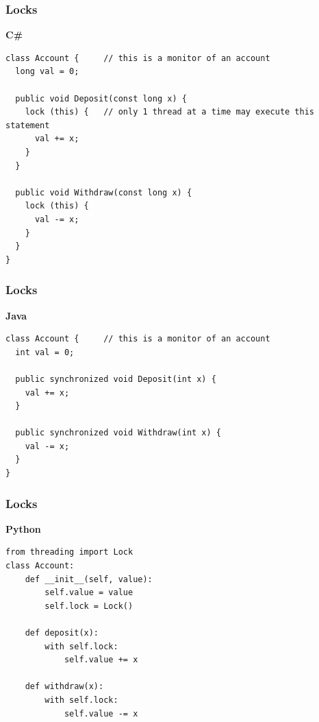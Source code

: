 \documentclass[t]{beamer}
\begin{document}

\begin{frame}[fragile]
\frametitle{Locks}
\textbf{C\#}
\begin{verbatim}
class Account {     // this is a monitor of an account
  long val = 0;
 
  public void Deposit(const long x) {
    lock (this) {   // only 1 thread at a time may execute this statement
      val += x;
    }
  }
 
  public void Withdraw(const long x) {
    lock (this) {
      val -= x;
    }
  }
}
\end{verbatim}
\end{frame}

\begin{frame}[fragile]
\frametitle{Locks}
\textbf{Java}
\begin{verbatim}
class Account {     // this is a monitor of an account
  int val = 0;
 
  public synchronized void Deposit(int x) {
    val += x;
  }
 
  public synchronized void Withdraw(int x) {
    val -= x;
  }
}
\end{verbatim}
\end{frame}

\begin{frame}[fragile]
\frametitle{Locks}
\textbf{Python}
\begin{verbatim}
from threading import Lock
class Account:
    def __init__(self, value):
        self.value = value
        self.lock = Lock()

    def deposit(x):
        with self.lock:
            self.value += x

    def withdraw(x):
        with self.lock:
            self.value -= x
\end{verbatim}
\end{frame}
\end{document}
